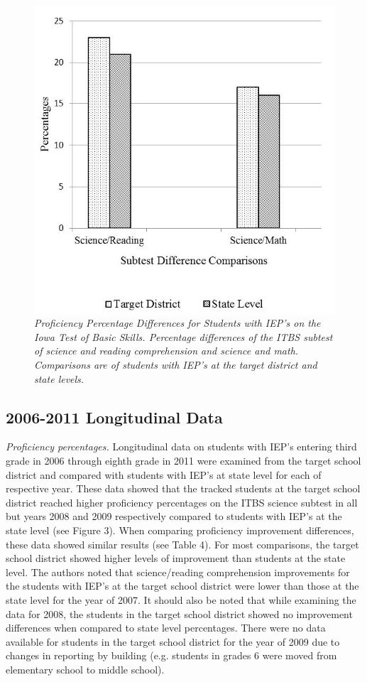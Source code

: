 \documentclass[11.5pt]{sig-alternate} %
\begin{document}
\begin{large}
\begin{figure}[t]
    \includegraphics[width=\columnwidth]{Figure 2.jpg}
    \caption{\textit{Proficiency Percentage Differences for Students with IEP’s on the Iowa Test of Basic Skills. Percentage differences of the ITBS subtest of science and reading comprehension and science and math. Comparisons are of students with IEP’s at the target district and state levels.}}
    \label{Figure 2}
\end{figure}

\subsection*{2006-2011 Longitudinal Data}
\textit{Proficiency percentages.} Longitudinal data on students with IEP’s entering third grade in 2006 through eighth grade in 2011 were examined from the target school district and compared with students with IEP’s at state level for each of respective year. These data showed that the tracked students at the target school district reached higher proficiency percentages on the ITBS science subtest in all but years 2008 and 2009 respectively compared to students with IEP’s at the state level (see Figure 3). When comparing proficiency improvement differences, these data showed similar results (see Table 4). For most comparisons, the target school district showed higher levels of improvement than students at the state level. The authors noted that science/reading comprehension improvements for the students with IEP’s at the target school district were lower than those at the state level for the year of 2007. It should also be noted that while examining the data for 2008, the students in the target school district showed no improvement differences when compared to state level percentages. There were no data available for students in the target school district for the year of 2009 due to changes in reporting by building (e.g. students in grades 6 were moved from elementary school to middle school).


\end{large}
\end{document}
